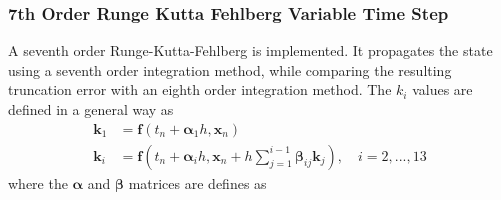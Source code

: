 \subsubsection{7th Order Runge Kutta Fehlberg Variable Time Step}
A seventh order Runge-Kutta-Fehlberg is implemented. It propagates the state using a seventh order integration method, while comparing the resulting truncation error with an eighth order integration method. The $k_i$ values are defined in a general way as
\begin{align}
	\bm k_1 &= \bm f\left(t_{n} + \bm\alpha_1 h, \bm x_{n} \right)\\
	\bm k_i &= \bm f\left(t_{n} + \bm\alpha_i h, \bm x_{n} + h \sum_{j=1}^{i-1}\bm\beta_{ij} \bm k_j\right), \quad i=2,...,13
\end{align}
where the $\bm\alpha$ and $\bm\beta$ matrices are defines as
\setcounter{MaxMatrixCols}{15}
